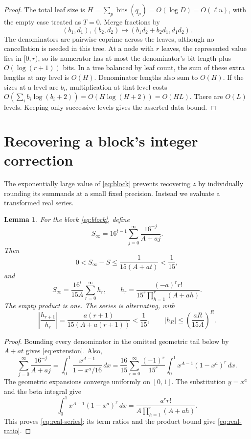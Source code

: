 \documentclass[11pt]{article}
\numberwithin{equation}{section}
\newtheorem{lemma}[theorem]{Lemma}
\theoremstyle{definition}
\newcommand{\bits}{\operatorname{bits}}
\begin{document}
\begin{proof}
The total leaf size is
$H=\sum_p\bits(q_p)=O(\log D)=O(\ell u)$, with the empty
case treated as $T=0$. Merge fractions by
\[
 (b_1,d_1),(b_2,d_2)\longmapsto
 (b_1d_2+b_2d_1,d_1d_2).
\]
The denominators are pairwise coprime across the leaves, although
no cancellation is needed in this tree. At a node with $r$ leaves,
the represented value lies in $[0,r)$, so its numerator has at
most the denominator's bit length plus $O(\log(r+1))$ bits.
In a tree balanced by leaf count, the sum of these extra lengths
at any level is $O(H)$. Denominator lengths also sum to $O(H)$.
If the sizes at a level are $b_i$, multiplication at that level
costs
$O(\sum_i b_i\log(b_i+2))=O(H\log(H+2))=O(HL)$.
There are $O(L)$ levels. Keeping only successive levels gives
the asserted data bound.
\end{proof}

\section{Recovering a block's integer correction}\label{sec:real}

The exponentially large value of \eqref{eq:block} prevents
recovering $z$ by individually rounding its summands at a small
fixed precision. Instead we evaluate a transformed real series.

\begin{lemma}\label{lem:real-series}
For the block \eqref{eq:block}, define
\[
 S_\infty=16^{t-1}\sum_{j=0}^{\infty}\frac{16^{-j}}{A+aj}.
\]
Then
\begin{equation}\label{eq:extension}
 0<S_\infty-S\le\frac{1}{15(A+at)}<\frac1{15},
\end{equation}
and
\begin{equation}\label{eq:real-series}
 S_\infty=\frac{16^t}{15A}\sum_{r=0}^{\infty}h_r,\qquad
 h_r=\frac{(-a)^r r!}
 {15^r\prod_{h=1}^{r}(A+ah)}.
\end{equation}
The empty product is one. The series is alternating, with
\begin{equation}\label{eq:real-ratio}
 \left|\frac{h_{r+1}}{h_r}\right|
 =\frac{a(r+1)}{15(A+a(r+1))}<\frac1{15},
 \qquad |h_R|\le\left(\frac{aR}{15A}\right)^R.
\end{equation}
\end{lemma}

\begin{proof}
Bounding every denominator in the omitted geometric tail below
by $A+at$ gives \eqref{eq:extension}. Also,
\[
 \sum_{j=0}^{\infty}\frac{16^{-j}}{A+aj}
 =\int_0^1\frac{x^{A-1}}{1-x^a/16}\,dx
 =\frac{16}{15}\sum_{r=0}^{\infty}
 \frac{(-1)^r}{15^r}\int_0^1x^{A-1}(1-x^a)^r\,dx.
\]
The geometric expansions converge uniformly on $[0,1]$.
The substitution $y=x^a$ and the beta integral give
\[
 \int_0^1x^{A-1}(1-x^a)^r\,dx
 =\frac{a^r r!}{A\prod_{h=1}^{r}(A+ah)}.
\]
This proves \eqref{eq:real-series}; its term ratios and
the product bound give \eqref{eq:real-ratio}.
\end{proof}
\end{document}
